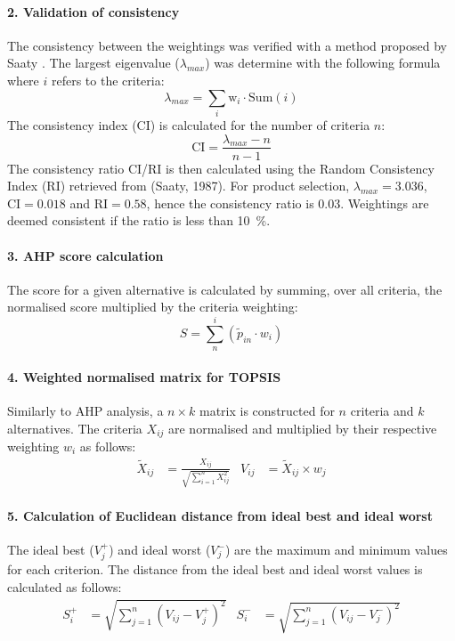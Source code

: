 \paragraph{2. Validation of consistency}
The consistency between the weightings was verified with a method proposed by Saaty \cite{saaty_analytic_1987}. The largest eigenvalue ($\lambda_{max}$) was determine with the following formula where $i$ refers to the criteria:
\begin{equation}
    \lambda_{max}=\sum_{i} \mathrm{w}_{i}\cdot \mathrm{Sum}(i)
\end{equation}
The consistency index (CI) is calculated for the number of criteria $n$:
\begin{equation}
   \mathrm{CI} = \frac{\lambda_{max}-n}{n-1}
\end{equation}
The consistency ratio CI/RI is then calculated using the Random Consistency Index (RI) retrieved from (Saaty, 1987). 
For product selection, $\lambda_{max}=3.036$, $\mathrm{CI}=0.018$ and $\mathrm{RI}=0.58$, hence the consistency ratio is 0.03. Weightings are deemed consistent if the ratio is less than \SI{10}{\percent}.

\paragraph{3. AHP score calculation}
The score for a given alternative is calculated by summing, over all criteria, the normalised score multiplied by the criteria weighting:
\begin{equation}
    S=\sum^{i}_{n}(\tilde{p}_{in} \cdot w_{i})
\end{equation}

\paragraph{4. Weighted normalised matrix for TOPSIS}
Similarly to AHP analysis, a $n\times k$ matrix is constructed for $n$ criteria and $k$ alternatives. The criteria $X_{ij}$ are normalised and multiplied by their respective weighting $w_i$ as follows:
\begin{align}
    \tilde{X}_{ij}&=\frac{X_{ij}}{\sqrt{\sum^{n}_{i=1}X_{ij}^{2}}} &
    V_{ij}&=\tilde{X}_{ij}\times w_j
\end{align}

\paragraph{5. Calculation of Euclidean distance from ideal best and ideal worst}
The ideal best ($V_{j}^{+}$) and ideal worst ($V_{j}^{-}$) are the maximum and minimum values for each criterion. The distance from the ideal best and ideal worst values is calculated as follows:
\begin{align}
    S_{i}^{+}&=\sqrt{\sum_{j=1}^{n}(V_{ij}-V_{j}^{+})^2} &
    S_{i}^{-}&=\sqrt{\sum_{j=1}^{n}(V_{ij}-V_{j}^{-})^2}
\end{align}

